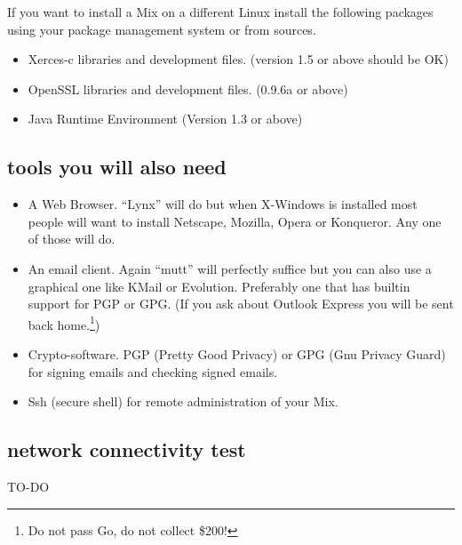 \documentclass{article}
\begin{document}
If you want to install a Mix on a different Linux install the
following packages using your package management system or from sources.

\begin{itemize}
\item Xerces-c libraries and development files. (version 1.5 or above should be OK)

\item OpenSSL libraries and development files. (0.9.6a or above)

\item Java Runtime Environment (Version 1.3 or above)
\end{itemize}


\subsection{tools you will also need}

\begin{itemize}
\item{A Web Browser}. ``Lynx'' will do but when X-Windows is installed most
people will want to install Netscape, Mozilla, Opera or Konqueror. Any
one of those will do.

\item{An email client}. Again ``mutt'' will perfectly suffice but you can
also use a graphical one like KMail or Evolution. Preferably one that
has builtin support for PGP or GPG. (If you ask about Outlook Express
you will be sent back home.\footnote{Do not pass Go, do not collect
  \$200!})

\item{Crypto-software}. PGP (Pretty Good Privacy) or GPG (Gnu Privacy
  Guard) for signing emails and checking signed emails.

\item{Ssh} (secure shell) for remote administration of your Mix.
\end{itemize}

\subsection{network connectivity test}

TO-DO

\end{document}
